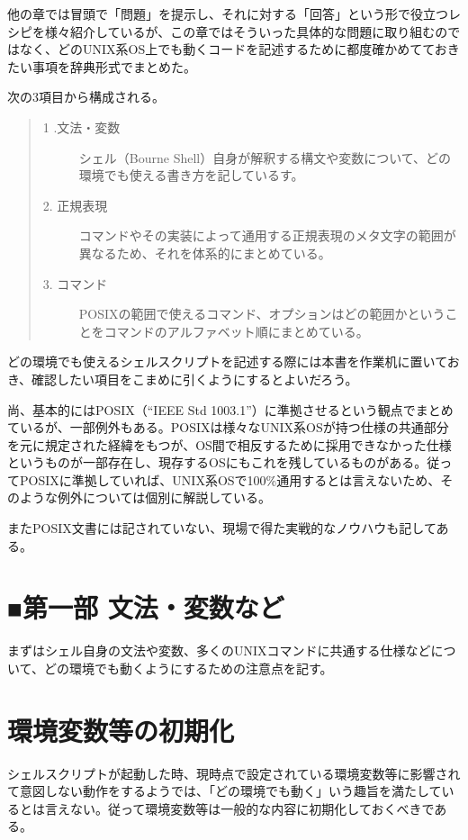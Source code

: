 他の章では冒頭で「問題」を提示し、それに対する「回答」という形で役立つレシピを様々紹介しているが、この章ではそういった具体的な問題に取り組むのではなく、どのUNIX系OS上でも動くコードを記述するために都度確かめてておきたい事項を辞典形式でまとめた。

次の3項目から構成される。
\begin{quotation}
\noindent
\begin{description}
  \item[1 .文法・変数] シェル（Bourne Shell）自身が解釈する構文や変数について、どの環境でも使える書き方を記しているす。
  \item[2. 正規表現]   コマンドやその実装によって通用する正規表現のメタ文字の範囲が異なるため、それを体系的にまとめている。
  \item[3. コマンド]   POSIXの範囲で使えるコマンド、オプションはどの範囲かということをコマンドのアルファベット順にまとめている。
\end{description}
\end{quotation}
どの環境でも使えるシェルスクリプトを記述する際には本書を作業机に置いておき、確認したい項目をこまめに引くようにするとよいだろう。

尚、基本的にはPOSIX（``IEEE Std 1003.1''）に準拠させるという観点でまとめているが、一部例外もある。POSIXは様々なUNIX系OSが持つ仕様の共通部分を元に規定された経緯をもつが、OS間で相反するために採用できなかった仕様というものが一部存在し、現存するOSにもこれを残しているものがある。従ってPOSIXに準拠していれば、UNIX系OSで100\%{}通用するとは言えないため、そのような例外については個別に解説している。

またPOSIX文書には記されていない、現場で得た実戦的なノウハウも記してある。


\section*{■第一部 文法・変数など}

まずはシェル自身の文法や変数、多くのUNIXコマンドに共通する仕様などについて、どの環境でも動くようにするための注意点を記す。

\section{環境変数等の初期化}
\label{allenvs:initenv}

シェルスクリプトが起動した時、現時点で設定されている環境変数等に影響されて意図しない動作をするようでは、「どの環境でも動く」いう趣旨を満たしているとは言えない。従って環境変数等は一般的な内容に初期化しておくべきである。

